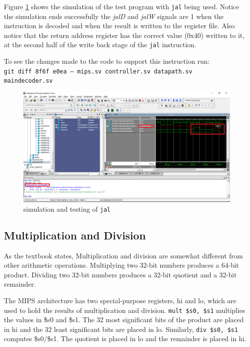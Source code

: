 \documentclass[titlepage,12pt,oneside,a4paper]{article}
\newcommand{\code}[1]{{\texttt{#1}}}
\begin{document}
Figure \ref{fig:jaltest} shows the simulation of the test program with \code{jal} being used. Notice the simulation ends successfully the \textit{jalD} and \textit{jalW} signals are 1 when the instruction is decoded and when the result is written to the register file. Also notice that the return address register has the correct value (0x40) written to it, at the second half of the write back stage of the \code{jal} instruction.

To see the changes made to the code to support this instruction run: \\
\code{git diff 8f6f e0ea -- mips.sv controller.sv datapath.sv \\ maindecoder.sv}

\begin{figure}
	\includegraphics[width=\textwidth]{jaltest.png}
	\centering
	\caption{simulation and testing of \code{jal}}
	\label{fig:jaltest}
\end{figure}

\subsection{Multiplication and Division}
As the textbook states, Multiplication and division are somewhat different from other arithmetic operations. Multiplying two 32-bit numbers produces a 64-bit product. Dividing two 32-bit numbers produces a 32-bit quotient and a 32-bit remainder.

The MIPS architecture has two special-purpose registers, hi and lo, which are used to hold the results of multiplication and division. \code{mult \$s0, \$s1} multiplies the values in \$s0 and \$s1. The 32 most significant bits of the product are placed in hi and the 32 least significant bits are placed in lo. Similarly, \code{div \$s0, \$s1} computes \$s0/\$s1. The quotient is placed in lo and the remainder is placed in hi.
\end{document}
